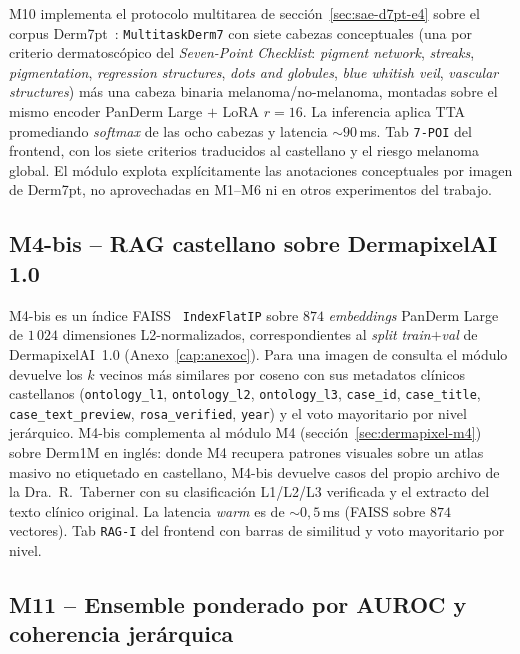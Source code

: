 M10 implementa el protocolo multitarea de
secci\'on~\ref{sec:sae-d7pt-e4} sobre el corpus
Derm7pt~\cite{kawahara2019}: \texttt{MultitaskDerm7} con siete
cabezas conceptuales (una por criterio dermatoscópico del
\emph{Seven-Point Checklist}: \emph{pigment network}, \emph{streaks},
\emph{pigmentation}, \emph{regression structures},
\emph{dots and globules}, \emph{blue whitish veil},
\emph{vascular structures}) más una cabeza binaria
melanoma/no-melanoma, montadas sobre el mismo encoder PanDerm
Large $+$ LoRA $r = 16$. La inferencia aplica TTA promediando
\emph{softmax} de las ocho cabezas y latencia $\sim 90$\,ms.
Tab \texttt{7-POI} del frontend, con los siete criterios
traducidos al castellano y el riesgo melanoma global. El módulo
explota explícitamente las anotaciones conceptuales por imagen
de Derm7pt, no aprovechadas en M1--M6 ni en otros experimentos
del trabajo.

\subsection{M4-bis -- RAG castellano sobre DermapixelAI 1.0}
\label{sec:dermapixel-m4bis}

M4-bis es un índice FAISS~\cite{faiss2019} \texttt{IndexFlatIP}
sobre $874$ \emph{embeddings} PanDerm Large de $1\,024$
dimensiones L2-normalizados, correspondientes al \emph{split}
\emph{train}$+$\emph{val} de DermapixelAI~1.0 (Anexo~\ref{cap:anexoc}).
Para una imagen de consulta el módulo devuelve los $k$ vecinos
más similares por coseno con sus metadatos clínicos castellanos
(\texttt{ontology\_l1}, \texttt{ontology\_l2}, \texttt{ontology\_l3},
\texttt{case\_id}, \texttt{case\_title}, \texttt{case\_text\_preview},
\texttt{rosa\_verified}, \texttt{year}) y el voto mayoritario por
nivel jerárquico. M4-bis complementa al módulo M4
(secci\'on~\ref{sec:dermapixel-m4}) sobre Derm1M en inglés: donde
M4 recupera patrones visuales sobre un atlas masivo no etiquetado
en castellano, M4-bis devuelve casos del propio archivo de la
Dra.~R.~Taberner con su clasificación L1/L2/L3 verificada y el
extracto del texto clínico original. La latencia \emph{warm} es
de $\sim 0{,}5$\,ms (FAISS sobre $874$ vectores). Tab
\texttt{RAG-I} del frontend con barras de similitud y voto
mayoritario por nivel.

\subsection{M11 -- Ensemble ponderado por AUROC y coherencia
jerárquica}
\label{sec:dermapixel-m11sub}

